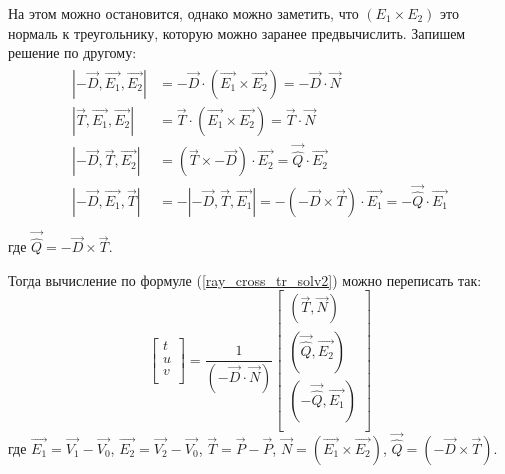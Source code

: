 \documentclass[12pt, a4paper]{article}
\begin{document}
На этом можно остановится, однако можно заметить, что $ (E_1 \times E_2) $ это нормаль к треугольнику, которую можно заранее предвычислить. 
Запишем решение по другому:
\begin{eqnarray*}
\begin{split}
| -\vec{D}, \vec{E_1}, \vec{E_2} | & = -\vec{D} \cdot (\vec{E_1} \times \vec{E_2}) = -\vec{D} \cdot \vec{N}\\
| \vec{T}, \vec{E_1}, \vec{E_2} | & = \vec{T} \cdot (\vec{E_1} \times \vec{E_2}) = \vec{T} \cdot \vec{N}\\
| -\vec{D}, \vec{T}, \vec{E_2} | & = (\vec{T} \times -\vec{D}) \cdot \vec{E_2} = \vec{\hat{Q}} \cdot \vec{E_2}\\
| -\vec{D}, \vec{E_1}, \vec{T} | & = - | - \vec{D}, \vec{T}, \vec{E_1} | = -(-\vec{D} \times \vec{T} ) \cdot \vec{E_1} = - \vec{\hat{Q}} \cdot \vec{E_1}\\
\end{split}
\end{eqnarray*}
где 
$\vec{\hat{Q}} = -\vec{D} \times \vec{T}$.

Тогда вычисление по формуле (\ref{ray_cross_tr_solv2}) можно переписать так:
\begin{equation*}
\left[  
\begin{array}{c} t \\ u \\ v \\ \end{array}
\right] = 
\frac{1}{(-\vec{D} \cdot \vec{N})} 
\left[  
	\begin{array}{c}
	(\vec{T}, \vec{N}) \\
	(\vec{\hat{Q}}, \vec{E_2}) \\	
	(-\vec{\hat{Q}}, \vec{E_1}) \\	
	\end{array}
\right]
\end{equation*}
где 
$\vec{E_1} = \vec{V_1} - \vec{V_0}$,
$\vec{E_2} = \vec{V_2} - \vec{V_0}$,
$\vec{T}   = \vec{P} - \vec{P}$,
$\vec{N} = (\vec{E_1} \times \vec{E_2})$,
$\vec{\hat{Q}} = (-\vec{D} \times \vec{T})$.
\end{document}
